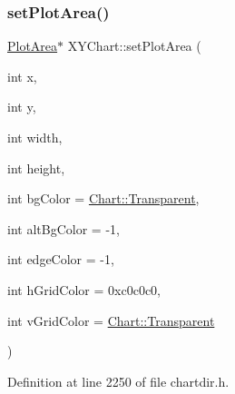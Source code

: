 \subsubsection{\texorpdfstring{set\+Plot\+Area()}{setPlotArea()}}
{\footnotesize\ttfamily \hyperlink{class_plot_area}{Plot\+Area}$\ast$ X\+Y\+Chart\+::set\+Plot\+Area (\begin{DoxyParamCaption}\item[{int}]{x,  }\item[{int}]{y,  }\item[{int}]{width,  }\item[{int}]{height,  }\item[{int}]{bg\+Color = {\ttfamily \hyperlink{namespace_chart_abee0d882fdc9ad0b001245ad9fc64011afc6811800a9e2582dac0157b6279f836}{Chart\+::\+Transparent}},  }\item[{int}]{alt\+Bg\+Color = {\ttfamily -\/1},  }\item[{int}]{edge\+Color = {\ttfamily -\/1},  }\item[{int}]{h\+Grid\+Color = {\ttfamily 0xc0c0c0},  }\item[{int}]{v\+Grid\+Color = {\ttfamily \hyperlink{namespace_chart_abee0d882fdc9ad0b001245ad9fc64011afc6811800a9e2582dac0157b6279f836}{Chart\+::\+Transparent}} }\end{DoxyParamCaption})\hspace{0.3cm}{\ttfamily [inline]}}



Definition at line 2250 of file chartdir.\+h.

